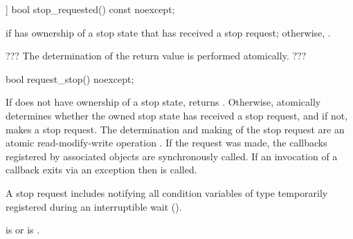 {%
\begin{itemdecl}
[[nodiscard]] bool stop_requested() const noexcept;
\end{itemdecl}
\begin{itemdescr}
  \pnum\returns {} if  has ownership of a stop state that has received a stop request;
                otherwise, .
                
                ??? The determination of the return value is performed atomically. ???
\end{itemdescr}

%
\begin{itemdecl}
bool request_stop() noexcept;
\end{itemdecl}
\begin{itemdescr}

  \pnum\effects If  does not have ownership of a stop state, returns . 
                Otherwise, atomically determines whether the owned stop state has received a stop request,
                and if not, makes a stop request.
                The determination and making of the stop request are an
                atomic read-modify-write operation .
                If the request was made, the callbacks registered by associated 
                objects are synchronously called.
                If an invocation of a callback exits via an exception 
                then  is called.
                \begin{note} A stop request includes notifying all condition variables
                             of type 
                             temporarily registered during an interruptible wait ().
                             \end{note}

  \pnum\postconditions {} is  or  is .


\end{itemdescr}}
